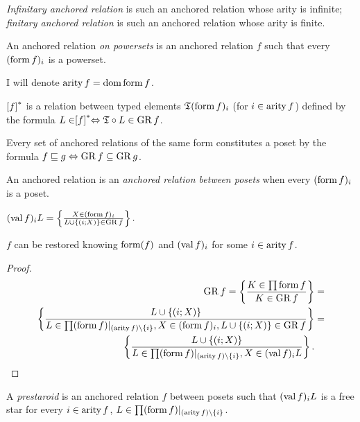 \begin{defn}
\emph{Infinitary
anchored relation} is such an anchored relation whose arity is infinite;
\emph{finitary anchored relation} is such an anchored relation whose
arity is finite.
\end{defn}

\begin{defn}
An anchored relation \emph{on
powersets} is an anchored relation $f$ such that every $(\operatorname{form} f)_{i}$
is a powerset.
\end{defn}
I will denote $\operatorname{arity} f=\operatorname{dom}\operatorname{form} f$.
\begin{defn}
$\mathrel{\left[f\right]^{\ast}}$ is a relation between typed elements $\mathfrak{T}(\operatorname{form} f)_{i}$
(for $i\in\operatorname{arity} f$) defined by the formula $L\in\mathrel{\left[f\right]^{\ast}}\Leftrightarrow\mathfrak{T}\circ L\in\operatorname{GR} f$.

Every set of anchored relations of the same form constitutes a poset
by the formula $f\sqsubseteq g\Leftrightarrow\operatorname{GR} f\subseteq\operatorname{GR} g$.
\end{defn}

\begin{defn}
An anchored relation is an
\emph{anchored relation between posets} when every $(\operatorname{form} f)_{i}$
is a poset.
\end{defn}

\begin{defn}
$(\operatorname{val} f)_{i}L=\left\{ \frac{X\in(\operatorname{form} f)_{i}}{L\cup\{(i;X)\}\in\operatorname{GR} f}\right\}.$\end{defn}
\begin{prop}
$f$ can be restored knowing $\operatorname{form}(f)$ and $(\operatorname{val} f)_{i}$ for some
$i\in\operatorname{arity} f$.\end{prop}
\begin{proof}
~
\begin{align*}
\operatorname{GR} f=\left\{ \frac{K\in\prod\operatorname{form} f}{K\in\operatorname{GR} f}\right\} & =\\
\left\{ \frac{L\cup\{(i;X)\}}{L\in\prod(\operatorname{form} f)|_{(\operatorname{arity} f)\setminus\{i\}},X\in(\operatorname{form} f)_{i},L\cup\{(i;X)\}\in\operatorname{GR} f}\right\} & =\\
\left\{ \frac{L\cup\{(i;X)\}}{L\in\prod(\operatorname{form} f)|_{(\operatorname{arity} f)\setminus\{i\}},X\in(\operatorname{val} f)_{i}L}\right\}.
\end{align*}
\end{proof}
\begin{defn}
A \emph{prestaroid} is an anchored relation $f$
between posets such that $(\operatorname{val} f)_{i}L$ is a free star for every
$i\in\operatorname{arity} f$, $L\in\prod(\operatorname{form} f)|_{(\operatorname{arity} f)\setminus\{i\}}$.
\end{defn}

